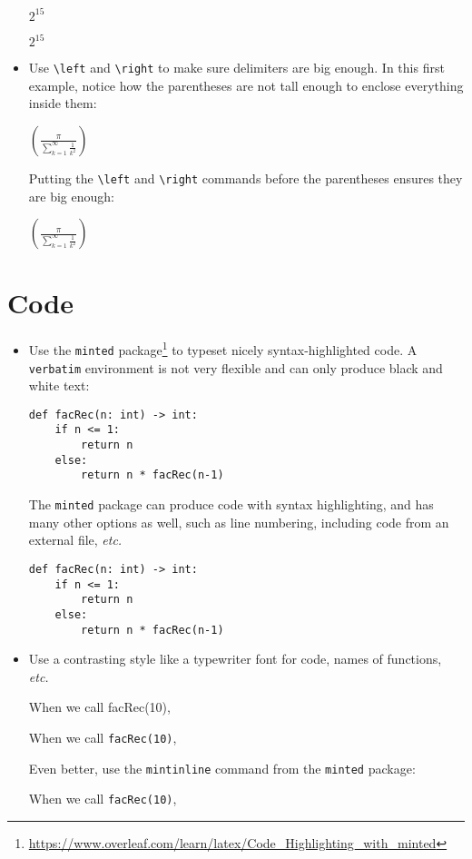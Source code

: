 \documentclass{article}
\begin{document}
\begin{itemize}
  \begin{bad}
$2^15$
  \end{bad}
  \begin{good}
$2^{15}$
  \end{good}
\item Use \verb|\left| and \verb|\right| to make sure delimiters are
  big enough.  In this first example, notice how the parentheses are
  not tall enough to enclose everything inside them:
  \begin{bad}
$(\frac{\pi}{\sum_{k=1}^{\infty} \frac{1}{k^2}})$
  \end{bad}
  Putting the \verb|\left| and \verb|\right| commands before the
  parentheses ensures they are big enough:
  \begin{good}
$\left( \frac{\pi}{\sum_{k=1}^{\infty} \frac{1}{k^2}} \right)$
  \end{good}
\end{itemize}

\section*{Code}

\begin{itemize}
\item Use the \texttt{minted}
  package\footnote{\url{https://www.overleaf.com/learn/latex/Code_Highlighting_with_minted}}
  to typeset nicely syntax-highlighted code.  A \verb|verbatim|
  environment is not very flexible and can only produce black and
  white text:
  \begin{bad}
\begin{verbatim}
def facRec(n: int) -> int:
    if n <= 1:
        return n
    else:
        return n * facRec(n-1)
\end{verbatim}
  \end{bad}
The \texttt{minted} package can produce code with syntax highlighting,
and has many other options as well, such as line numbering, including
code from an external file, \emph{etc.}
  \begin{good}
\begin{verbatim}
def facRec(n: int) -> int:
    if n <= 1:
        return n
    else:
        return n * facRec(n-1)
\end{verbatim}
  \end{good}
\item Use a contrasting style like a typewriter font for code, names
  of functions, \emph{etc.}
  \begin{bad}When we call facRec(10),\end{bad}
  \begin{good}When we call \texttt{facRec(10)},\end{good}
  Even better, use the \verb|mintinline| command from the
  \texttt{minted} package:
  \begin{good}When we call \texttt{facRec(10)},\end{good}
\end{itemize}
\end{document}
